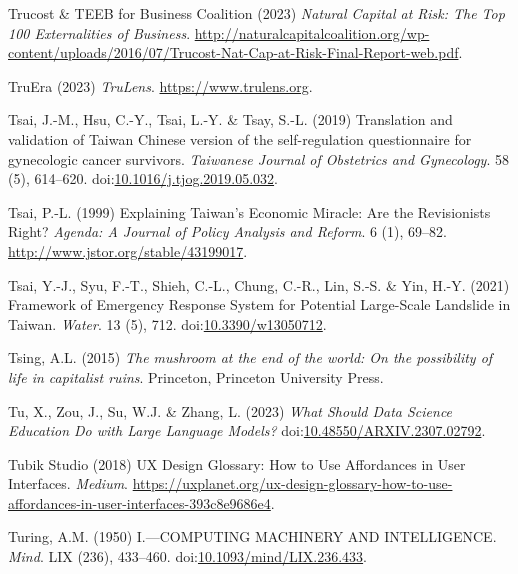 \documentclass[
  letterpaper,
  DIV=11,
  numbers=noendperiod]{scrartcl}
\newlength{\cslhangindent}
\newenvironment{CSLReferences}[2] %
 {\begin{list}{}{%
  \setlength{\itemindent}{0pt}
  \setlength{\leftmargin}{0pt}
  \setlength{\parsep}{0pt}
  \ifodd #1
   \setlength{\leftmargin}{\cslhangindent}
   \setlength{\itemindent}{-1\cslhangindent}
  \fi
  \setlength{\itemsep}{#2\baselineskip}}}
 {\end{list}}
\begin{document}
\begin{CSLReferences}{0}{1}
Trucost \& TEEB for Business Coalition (2023) \emph{Natural {Capital} at
{Risk}: {The Top} 100 {Externalities} of {Business}}.
\url{http://naturalcapitalcoalition.org/wp-content/uploads/2016/07/Trucost-Nat-Cap-at-Risk-Final-Report-web.pdf}.

TruEra (2023) \emph{{TruLens}}. \url{https://www.trulens.org}.

Tsai, J.-M., Hsu, C.-Y., Tsai, L.-Y. \& Tsay, S.-L. (2019) Translation
and validation of {Taiwan Chinese} version of the self-regulation
questionnaire for gynecologic cancer survivors. \emph{Taiwanese Journal
of Obstetrics and Gynecology}. 58 (5), 614--620.
doi:\href{https://doi.org/10.1016/j.tjog.2019.05.032}{10.1016/j.tjog.2019.05.032}.

Tsai, P.-L. (1999) Explaining {Taiwan}'s {Economic Miracle}: {Are} the
{Revisionists Right}? \emph{Agenda: A Journal of Policy Analysis and
Reform}. 6 (1), 69--82. \url{http://www.jstor.org/stable/43199017}.

Tsai, Y.-J., Syu, F.-T., Shieh, C.-L., Chung, C.-R., Lin, S.-S. \& Yin,
H.-Y. (2021) Framework of {Emergency Response System} for {Potential
Large-Scale Landslide} in {Taiwan}. \emph{Water}. 13 (5), 712.
doi:\href{https://doi.org/10.3390/w13050712}{10.3390/w13050712}.

Tsing, A.L. (2015) \emph{The mushroom at the end of the world: On the
possibility of life in capitalist ruins}. Princeton, Princeton
University Press.

Tu, X., Zou, J., Su, W.J. \& Zhang, L. (2023) \emph{What {Should Data
Science Education Do} with {Large Language Models}?}
doi:\href{https://doi.org/10.48550/ARXIV.2307.02792}{10.48550/ARXIV.2307.02792}.

Tubik Studio (2018) {UX Design Glossary}: {How} to {Use Affordances} in
{User Interfaces}. \emph{Medium}.
\url{https://uxplanet.org/ux-design-glossary-how-to-use-affordances-in-user-interfaces-393c8e9686e4}.

Turing, A.M. (1950) I.---{COMPUTING MACHINERY AND INTELLIGENCE}.
\emph{Mind}. LIX (236), 433--460.
doi:\href{https://doi.org/10.1093/mind/LIX.236.433}{10.1093/mind/LIX.236.433}.


\end{CSLReferences}
\end{document}
